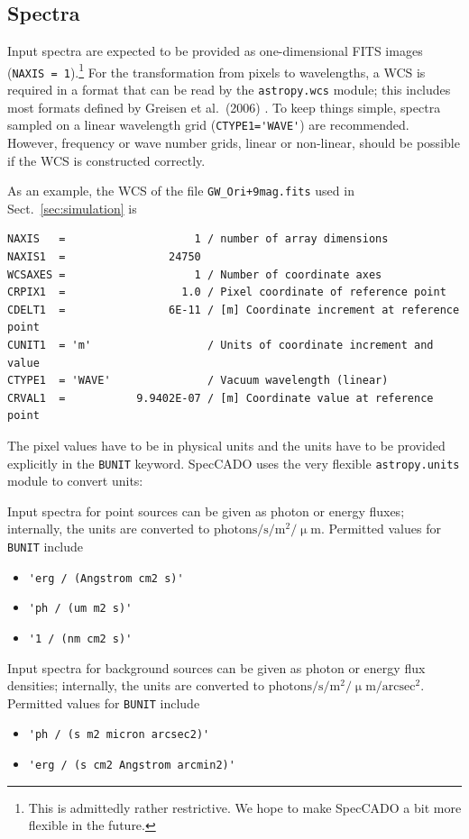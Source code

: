 \documentclass[a4paper,twoside,11pt]{article}
\newcommand{\micron}{\upmu\mathrm{m}}
\begin{document}
\subsection{Spectra}
\label{ssec:input_spectra}

Input spectra are expected to be provided as one-dimensional FITS
images (\lstinline{NAXIS = 1}).\footnote{This is admittedly rather
  restrictive. We hope to make SpecCADO a bit more flexible in the
  future.}  For the transformation from pixels to wavelengths, a WCS
is required in a format that can be read by the
\lstinline{astropy.wcs} module; this includes most formats defined by
Greisen et al.\ (2006) \cite{Greisen2006}. To keep things simple,
spectra sampled on a linear wavelength grid
(\lstinline{CTYPE1='WAVE'}) are recommended. However, frequency or
wave number grids, linear or non-linear, should be possible if the WCS
is constructed correctly.

As an example, the WCS of the file \lstinline{GW_Ori+9mag.fits} used
in Sect.~\ref{sec:simulation} is
\begin{lstlisting}
NAXIS   =                    1 / number of array dimensions
NAXIS1  =                24750
WCSAXES =                    1 / Number of coordinate axes
CRPIX1  =                  1.0 / Pixel coordinate of reference point
CDELT1  =                6E-11 / [m] Coordinate increment at reference point
CUNIT1  = 'm'                  / Units of coordinate increment and value
CTYPE1  = 'WAVE'               / Vacuum wavelength (linear)
CRVAL1  =           9.9402E-07 / [m] Coordinate value at reference point
\end{lstlisting}

The pixel values have to be in physical units and the units have to be
provided explicitly in the \lstinline{BUNIT} keyword. SpecCADO uses
the very flexible \lstinline{astropy.units} module to convert units:

Input spectra for point sources can be given as photon or energy
fluxes; internally, the units are converted to
$\mathrm{photons}/\mathrm{s}/\mathrm{m^{2}}/\micron$.  Permitted
values for \lstinline{BUNIT} include
\begin{itemize}
\item \lstinline{'erg / (Angstrom cm2 s)'}
\item \lstinline{'ph / (um m2 s)'}
\item \lstinline{'1 / (nm cm2 s)'}
\end{itemize}

Input spectra for background sources can be given as photon or energy
flux densities; internally, the units are converted to
$\mathrm{photons}/\mathrm{s}/\mathrm{m^{2}}/\micron/\mathrm{arcsec^{2}}$. Permitted
values for \lstinline{BUNIT} include
\begin{itemize}
\item \lstinline{'ph / (s m2 micron arcsec2)'}
\item \lstinline{'erg / (s cm2 Angstrom arcmin2)'}
\end{itemize}
\end{document}
